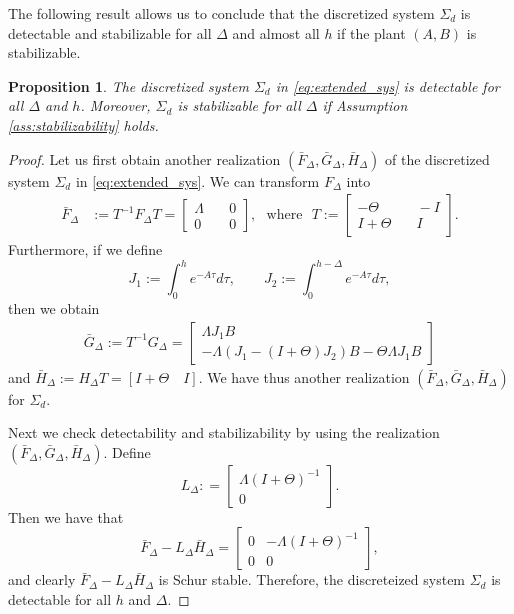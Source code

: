 \documentclass[letterpaper, 12pt, draftcls, onecolumn]{ieeeconf}
\newtheorem{proposition}[theorem]{Proposition}
\begin{document}
The following result allows us to conclude that the
discretized system $\Sigma_d$
is detectable and stabilizable for all $\Delta$ and almost all $h$
if the plant $(A,B)$ is stabilizable.
\begin{proposition}
	\label{prop:detectability_stabilizability}
	The discretized system $\Sigma_d$ in 
	\eqref{eq:extended_sys} is detectable for all $\Delta$ and $h$.
	Moreover, $\Sigma_d$ is stabilizable for all $\Delta$ if 
	Assumption \ref{ass:stabilizability} holds.
\end{proposition}
\begin{proof}
	Let us first obtain another realization 
	$(\bar{F}_{\Delta}, \bar{G}_{\Delta}, \bar{H}_{\Delta})$ of 
	the discretized system $\Sigma_d$ in \eqref{eq:extended_sys}.
	We can transform $F_{\Delta}$ into
	\begin{align*}
	\bar{F}_{\Delta} &:=
	T^{-1}F_{\Delta}T =
	\begin{bmatrix}
	\Lambda &\quad  0 \\
	0 &\quad  0
	\end{bmatrix},
	\text{~~where~~}
	T :=
	\begin{bmatrix}
	-\Theta &\quad  -I \\
	I + \Theta &\quad  I
	\end{bmatrix}. 
	\end{align*}
Furthermore,
	if we define
	\begin{equation*}
	J_1 :=
	\int^{h}_0 e^{-A\tau} d\tau,\qquad
	J_2 :=
	\int^{h-\Delta}_0 e^{-A\tau} d\tau,
	\end{equation*}
	then we obtain
	\begin{align*}
\bar G_{\Delta} := 
	T^{-1}G_{\Delta} 
	=
	\begin{bmatrix}
	\Lambda J_1B \\
	-\Lambda(J_1 - (I+\Theta)J_2)B- \Theta\Lambda J_1 B
	\end{bmatrix}
	\end{align*}
	and
$
	\bar{H}_{\Delta} := H_{\Delta}T =
	[
	I + \Theta \quad  I
	].
$
We have thus another realization 
	$(\bar{F}_{\Delta}, \bar{G}_{\Delta}, \bar{H}_{\Delta})$
	for $\Sigma_d$.
	
	Next we check detectability and stabilizability
	by using the realization 
	$(\bar{F}_{\Delta}, \bar{G}_{\Delta}, \bar{H}_{\Delta})$. 
Define
	\begin{equation}
	\label{eqw:L_def}
	L_{\Delta} : = 
	\begin{bmatrix}
	\Lambda (I+\Theta)^{-1} \\ 0
	\end{bmatrix}.
	\end{equation}
	Then we have that
	\begin{equation}
	\label{eq:FLH}
	\bar F_{\Delta}-L_{\Delta} \bar H_{\Delta}
	=
	\begin{bmatrix}
	0 & -\Lambda (I+\Theta)^{-1} \\
	0 & 0
	\end{bmatrix},
	\end{equation}
	and clearly
	$\bar F_{\Delta}-L_{\Delta} \bar H_{\Delta}$ is Schur stable.
Therefore,
	the discreteized system $\Sigma_d$ is detectable 
	for all $h$ and $\Delta$.
	

\end{proof}
\end{document}
